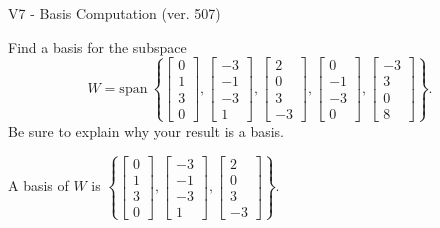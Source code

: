 \begin{exercise}
  \begin{exerciseTitle}V7 - Basis Computation (ver. 507)\end{exerciseTitle}
  \begin{exerciseStatement}
    Find a basis for the subspace 
\[W=\mathrm{span}\ \left\{\left[\begin{array}{r}
0 \\
1 \\
3 \\
0
\end{array}\right] , \left[\begin{array}{r}
-3 \\
-1 \\
-3 \\
1
\end{array}\right] , \left[\begin{array}{r}
2 \\
0 \\
3 \\
-3
\end{array}\right] , \left[\begin{array}{r}
0 \\
-1 \\
-3 \\
0
\end{array}\right] , \left[\begin{array}{r}
-3 \\
3 \\
0 \\
8
\end{array}\right]\right\}.\]
 Be sure to explain why your result is a basis.


  \end{exerciseStatement}
  \begin{exerciseAnswer}
   A basis of \(W\) is  \(\left\{\left[\begin{array}{r}
0 \\
1 \\
3 \\
0
\end{array}\right] , \left[\begin{array}{r}
-3 \\
-1 \\
-3 \\
1
\end{array}\right] , \left[\begin{array}{r}
2 \\
0 \\
3 \\
-3
\end{array}\right]\right\}\).
  


  \end{exerciseAnswer}
\end{exercise}